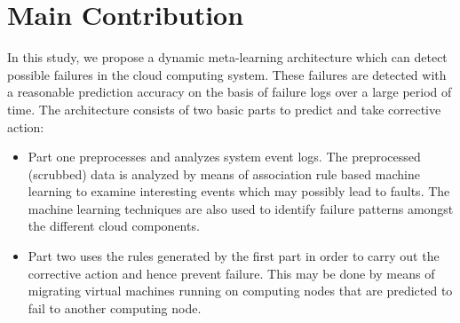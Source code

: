 \section{Main Contribution}
In this study, we propose a dynamic meta-learning architecture which can detect possible failures in the cloud computing system. These failures are detected with a reasonable prediction accuracy on the basis of failure logs over a large period of time. The architecture consists of two basic parts to predict and take corrective action:
	\begin{itemize}
		\item Part one preprocesses and analyzes system event logs. The preprocessed (scrubbed) data is analyzed by means of association rule based machine learning to examine interesting events which may possibly lead to faults. The machine learning techniques are also used to identify failure patterns amongst the different cloud components.
		\item Part two uses the rules generated by the first part in order to carry out the corrective action and hence prevent failure. This may be done by means of migrating virtual machines running on computing nodes that are predicted to fail to another computing node.
	\end{itemize}
